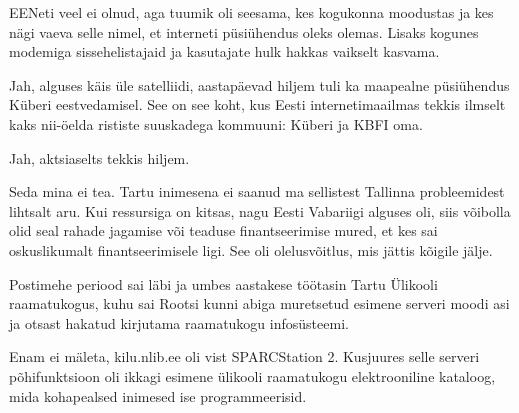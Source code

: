 
EENeti veel ei olnud, aga tuumik oli seesama, kes kogukonna 
moodustas ja kes nägi vaeva selle nimel, et interneti püsiühendus oleks 
olemas. Lisaks kogunes modemiga sissehelistajaid ja kasutajate hulk hakkas vaikselt kasvama.


Jah, alguses käis üle satelliidi, aastapäevad hiljem tuli ka maapealne 
püsiühendus Küberi eestvedamisel. See on see koht, kus 
Eesti internetimaailmas tekkis ilmselt kaks nii-öelda rististe suuskadega 
kommuuni: Küberi ja KBFI oma.


Jah, aktsiaselts tekkis hiljem.


Seda mina ei tea. Tartu inimesena ei saanud ma sellistest Tallinna 
probleemidest lihtsalt aru. Kui ressursiga on kitsas, nagu Eesti Vabariigi 
alguses oli, siis võibolla olid seal rahade jagamise 
või teaduse finantseerimise mured, et kes sai oskuslikumalt finantseerimisele 
ligi. See oli olelusvõitlus, mis jättis kõigile jälje.


Postimehe periood sai läbi ja umbes aastakese töötasin Tartu 
Ülikooli raamatukogus, kuhu sai Rootsi kunni 
abiga muretsetud esimene serveri moodi asi ja otsast hakatud kirjutama 
raamatukogu infosüsteemi.


Enam ei mäleta, kilu.nlib.ee oli vist 
SPARCStation 2. Kusjuures selle serveri põhifunktsioon oli ikkagi esimene ülikooli 
raamatukogu elektrooniline kataloog, mida kohapealsed inimesed ise 
programmeerisid.


